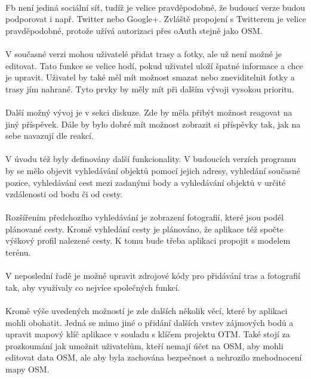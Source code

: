 \documentclass[11pt,a4paper,titlepage,oneside]{book}
\begin{document}
			\paragraph{}\ac{Fb} není jediná sociální síť, tudíž je velice pravděpodobné, že budoucí verze budou podporovat i např. Twitter nebo Google+. Zvláště propojení s Twitterem je velice pravděpodobné, protože užívá autorizaci přes oAuth stejně jako \acl{OSM}.
			\paragraph{}V současné verzi mohou uživatelé přidat trasy a fotky, ale už není možné je editovat. Tato funkce se velice hodí, pokud uživatel uloží špatné informace a chce je upravit. Uživatel by také měl mít možnost smazat nebo zneviditelnit fotky a trasy jím nahrané. Tyto prvky by měly mít při dalším vývoji vysokou prioritu.
			\paragraph{}Další možný vývoj je v sekci diskuze. Zde by měla přibýt možnost reagovat na jiný příspěvek. Dále by bylo dobré mít možnost zobrazit si příspěvky tak, jak na sebe navazují dle reakcí.
			\paragraph{}V úvodu též byly definovány další funkcionality. V budoucích verzích programu by se mělo objevit vyhledávání objektů pomocí jejich adresy, vyhledání současné pozice, vyhledávání cest mezi zadanými body a vyhledávání objektů v určité vzdálenosti od bodu či od cesty. 
			\paragraph{}Rozšířením předchozího vyhledávání je zobrazení fotografií, které jsou podél plánované cesty. Kromě vyhledání cesty je plánováno, že aplikace též spočte výškový profil nalezené cesty. K tomu bude třeba aplikaci propojit s modelem terénu.
			\paragraph{}V neposlední řadě je možné upravit zdrojové kódy pro přidávání tras a fotografií tak, aby využívaly co nejvíce společných funkcí.
			\paragraph{}Kromě výše uvedených možností je zde dalších několik věcí, které by aplikaci mohli obohatit. Jedná se mimo jiné o přidání dalších vrstev zájmových bodů a upravit mapový klíč aplikace v souladu s klíčem projektu \acl{OTM}. Také stojí za prozkoumání jak umožnit uživatelům, kteří nemají účet na \ac{OSM}, aby mohli editovat data \ac{OSM}, ale aby byla zachována bezpečnost a nehrozilo znehodnocení mapy \acl{OSM}.
\end{document}
